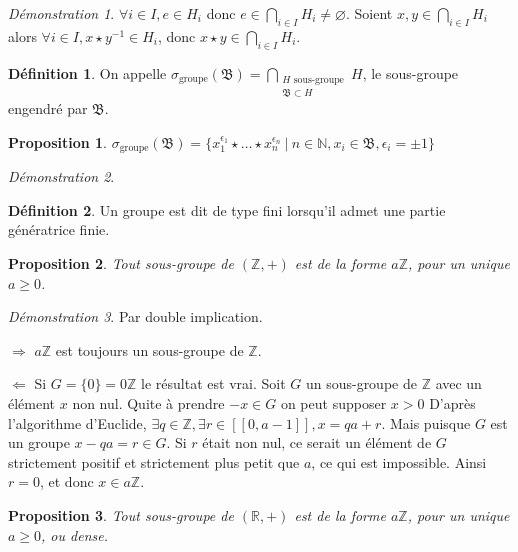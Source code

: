 \documentclass[a4paper, 11pt, french]{book}
\newenvironment{itemise}{\itemize}{\enditemize}
\let\colour=\color
\theoremstyle{plain} %
\newtheorem{proposition}{Proposition}
\theoremstyle{definition} %
\newtheorem{definition}{Définition}
\theoremstyle{remark} %
\newtheorem*{demonstration}{Démonstration}
\newcommand{\1}{\mathds{1}}
\newcommand\vide{\varnothing}
\newcommand{\inv}[1]{#1^{-1}}
\newcommand{\N}{\mathbb{N}}
\newcommand{\Z}{\mathbb{Z}}
\newcommand{\R}{\mathbb{R}}
\renewcommand{\frak}[1]{\mathfrak{#1}}
\newcommand{\rm}[1]{\mathrm{#1}}
\newcommand\ens[2]{\{#1 \ |\ #2\}}
\newcommand\equivalence[3]{
	\begin{demonstration}
		#1
		\begin{itemise}
			\item[$\Longrightarrow$] #2
			\item[$\Longleftarrow$] #3
		\end{itemise}
	\end{demonstration}
}
\begin{document}
\begin{demonstration}
	$\forall i\in I, e\in H_i$ donc $e\in\bigcap_{i\in I}H_i\neq\vide$.
	Soient $x, y\in\bigcap_{i\in I}H_i$ alors $\forall i\in I, x\star\inv{y}\in H_i$, donc $x\star y\in\bigcap_{i\in I}H_i$.
\end{demonstration}

\begin{definition}
	On appelle $\sigma_\rm{groupe}(\frak{B})=\bigcap_{\substack{H\text{ sous-groupe}\\\frak{B}\subset H}}H$, le sous-groupe engendré par $\frak{B}$.
\end{definition}

\begin{proposition}
	$\sigma_\rm{groupe}(\frak{B})=\ens{x_1^{\epsilon_1}\star\dots\star x_n^{\epsilon_n}}{n\in\N, x_i\in\frak{B}, \epsilon_i=\pm1}$
\end{proposition}

\begin{demonstration}
	\colour{red}{À démontrer}
\end{demonstration}

\begin{definition}
	Un groupe est dit de type fini lorsqu'il admet une partie génératrice finie.
\end{definition}

\begin{proposition}
	Tout sous-groupe de $(\Z, +)$ est de la forme $a\Z$, pour un unique $a\geqslant0$.
\end{proposition}

\equivalence{Par double implication.}{
	$a\Z$ est toujours un sous-groupe de $\Z$.
}{
	Si $G=\{0\}=0\Z$ le résultat est vrai.
	Soit $G$ un sous-groupe de $\Z$ avec un élément $x$ non nul.
	Quite à prendre $-x\in G$ on peut supposer $x>0$
	D'après l'algorithme d'Euclide, $\exists q\in\Z, \exists r\in[\![0, a-1]\!], x = qa + r$.
	Mais puisque $G$ est un groupe $x-qa=r\in G$.
	Si $r$ était non nul, ce serait un élément de $G$ strictement positif et strictement plus petit que $a$, ce qui est impossible.
	Ainsi $r=0$, et donc $x\in a\Z$.
}

\begin{proposition}
	Tout sous-groupe de $(\R, +)$ est de la forme $a\Z$, pour un unique $a\geqslant0$, ou dense.
\end{proposition}
\end{document}
